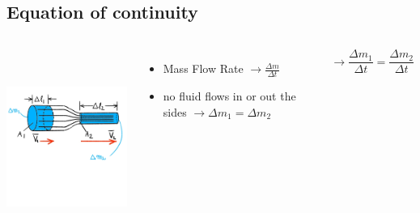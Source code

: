 \documentclass[]{beamer}
\begin{document}
\subsection{Equation of continuity}


\begin{frame}




 \begin{columns}[c]
   \column{2in}  %
  
 \begin{center}
  \includegraphics[height=2.5in]{images2/Fluids2.jpg}
\end{center}


   \column{2in}

\pause
\begin{itemize}
  \item Mass Flow Rate $\rightarrow \frac{\Delta m}{\Delta t}$ 
  \pause
  \item no fluid flows in or out the sides $\rightarrow \Delta m_1=\Delta m_2 $ 
  \pause

\end{itemize}

\begin{equation}
  \rightarrow \frac{\Delta m_1}{\Delta t}=\frac{\Delta m_2}{\Delta t}
\end{equation}

   \end{columns}

  \end{frame}

\end{document}
